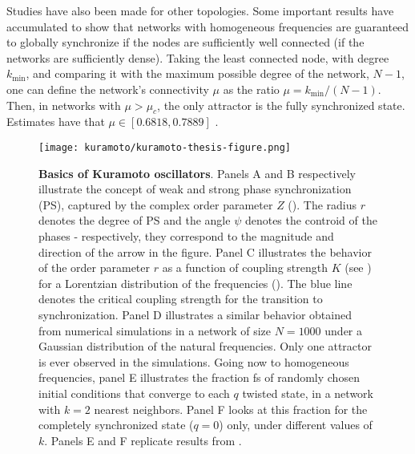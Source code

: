 Studies have also been made for other topologies. Some important results have accumulated to show that networks with homogeneous frequencies are guaranteed to globally synchronize if the nodes are sufficiently well connected (if the networks are sufficiently dense). Taking the least connected node, with degree $k_\mathrm{min}$, and comparing it with the maximum possible degree of the network, $N-1$, one can define the network's connectivity $\mu$ as the ratio $\mu = k_\mathrm{min}/(N-1)$. Then, in networks with $\mu > \mu_c$, the only attractor is the fully synchronized state. Estimates have that $\mu \in [0.6818, 0.7889]$ \cite{taylor2012there, townsend2020dense}. 
%
\begin{figure}
    \texttt{[image: kuramoto/kuramoto-thesis-figure.png]}
    \caption{\textbf{Basics of Kuramoto oscillators}. Panels A and B respectively illustrate the concept of weak and strong phase synchronization (PS), captured by the complex order parameter $Z$ (). The radius $r$ denotes the degree of PS and the angle $\psi$ denotes the controid of the phases - respectively, they correspond to the magnitude and direction of the arrow in the figure. Panel C illustrates the behavior of the order parameter $r$ as a function of coupling strength $K$ (see ) for a Lorentzian distribution of the frequencies (). The blue line denotes the critical coupling strength for the transition to synchronization. Panel D illustrates a similar behavior obtained from numerical simulations in a network of size $N=1000$ under a Gaussian distribution of the natural frequencies. Only one attractor is ever observed in the simulations. Going now to homogeneous frequencies, panel E illustrates the fraction fs of randomly chosen initial conditions that converge to each $q$ twisted state, in a network with $k=2$ nearest neighbors. Panel F looks at this fraction for the completely synchronized state ($q=0$) only, under different values of $k$. Panels E and F replicate results from \cite{wiley2006the}. }
    \label{fig:method:kuramoto}
\end{figure}

